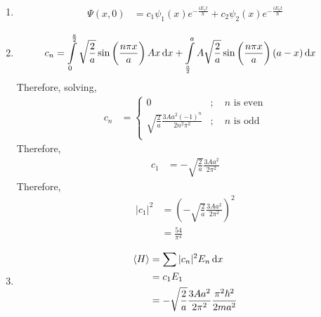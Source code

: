 \documentclass[fleqn, a4paper, 11pt, oneside]{amsart}
\theoremstyle{definition}
\theoremstyle{theorem}
\begin{document}
\begin{solution}
\begin{enumerate}[leftmargin=*]
\begin{figure}[H]
			\end{figure}
		\item
			\begin{align*}
				\Psi(x,0) & = c_1 \psi_1(x) e^{-\frac{i E_1 t}{\hbar}} + c_2 \psi_2(x) e^{-\frac{i E_2 t}{\hbar}}
			\end{align*}
		\item
			\begin{align*}
				c_n & = \int\limits_{0}^{\frac{a}{2}} \sqrt{\frac{2}{a}} \sin\left( \frac{n \pi x}{a} \right) A x \dif x + \int\limits_{\frac{a}{2}}^{a} A \sqrt{\frac{2}{a}} \sin\left( \frac{n \pi x}{a} \right) (a - x) \dif x
			\end{align*}
			Therefore, solving,
			\begin{align*}
				c_n &=
					\begin{cases}
						0                                                     & ;\quad n \text{ is even} \\
						\sqrt{\frac{2}{a}} \frac{3 A a^2 (-1)^n}{2 n^2 \pi^2} & ;\quad n \text{ is odd}  \\
					\end{cases}
			\end{align*}
			Therefore,
			\begin{align*}
				c_1 & = -\sqrt{\frac{2}{a}} \frac{3 A a^2}{2 \pi^2}
			\end{align*}
			Therefore,
			\begin{align*}
				|c_1|^2 & = \left( -\sqrt{\frac{2}{a}} \frac{3 A a^2}{2 \pi^2} \right)^2 \\
                                        & = \frac{54}{\pi^4}
			\end{align*}
		\item
			\begin{align*}
				\langle H \rangle & = \sum |c_n|^2 E_n \dif x \\
                                                  & = c_1 E_1                 \\
                                                  & = -\sqrt{\frac{2}{a}} \frac{3 A a^2}{2 \pi^2} \frac{\pi^2 \hbar^2}{2 m a^2}
			\end{align*}
	\end{enumerate}
\end{solution}
\end{document}
